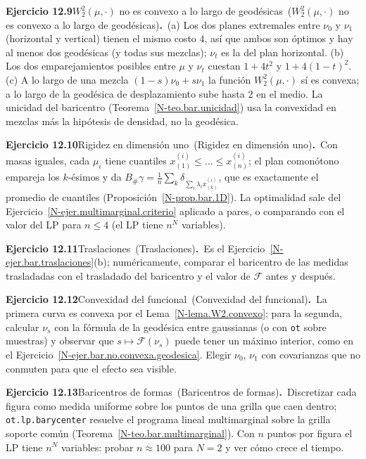 \documentclass[11pt,a4paper]{amsart}
\theoremstyle{remark}
\theoremstyle{definition}
\numberwithin{subsection}{section}
\numberwithin{equation}{section}
\newcommand{\ejlabel}[2]{\par\medskip\noindent\textbf{Ejercicio #1}\ifx\relax#2\relax\else\ (#2)\fi\textbf{.}\ }
\begin{document}
\ejlabel{12.9}{$W_2^2(\mu,\cdot)$ no es convexo a lo largo de geodésicas}(a) Los dos planes extremales entre $\nu_0$ y $\nu_1$ (horizontal y vertical) tienen el mismo costo $4$, así que ambos son óptimos y hay al menos dos geodésicas (y todas sus mezclas); $\nu_t$ es la del plan horizontal. (b) Los dos emparejamientos posibles entre $\mu$ y $\nu_t$ cuestan $1+4t^2$ y $1+4(1-t)^2$. (c) A lo largo de una mezcla $(1-s)\nu_0+s\nu_1$ la función $W_2^2(\mu,\cdot)$ sí es convexa; a lo largo de la geodésica de desplazamiento sube hasta $2$ en el medio. La unicidad del baricentro (Teorema~\ref{N-teo.bar.unicidad}) usa la convexidad en mezclas más la hipótesis de densidad, no la geodésica.

\ejlabel{12.10}{Rigidez en dimensión uno}Con masas iguales, cada $\mu_i$ tiene cuantiles $x^{(i)}_{(1)}\le\dots\le x^{(i)}_{(n)}$; el plan comonótono empareja los $k$-ésimos y da $B_\#\gamma=\frac1n\sum_k\delta_{\sum_i\lambda_ix^{(i)}_{(k)}}$, que es exactamente el promedio de cuantiles (Proposición~\ref{N-prop.bar.1D}). La optimalidad sale del Ejercicio~\ref{N-ejer.multimarginal.criterio} aplicado a pares, o comparando con el valor del LP para $n\le4$ (el LP tiene $n^N$ variables).

\ejlabel{12.11}{Traslaciones}Es el Ejercicio~\ref{N-ejer.bar.traslaciones}(b); numéricamente, comparar el baricentro de las medidas trasladadas con el trasladado del baricentro y el valor de $\mathcal F$ antes y después.

\ejlabel{12.12}{Convexidad del funcional}La primera curva es convexa por el Lema~\ref{N-lema.W2.convexo}; para la segunda, calcular $\nu_s$ con la fórmula de la geodésica entre gaussianas (o con \texttt{ot} sobre muestras) y observar que $s\mapsto\mathcal F(\nu_s)$ puede tener un máximo interior, como en el Ejercicio~\ref{N-ejer.bar.no.convexa.geodesica}. Elegir $\nu_0$, $\nu_1$ con covarianzas que no conmuten para que el efecto sea visible.

\ejlabel{12.13}{Baricentros de formas}Discretizar cada figura como medida uniforme sobre los puntos de una grilla que caen dentro; \texttt{ot.lp.barycenter} resuelve el programa lineal multimarginal sobre la grilla soporte común (Teorema~\ref{N-teo.bar.multimarginal}). Con $n$ puntos por figura el LP tiene $n^N$ variables: probar $n\approx100$ para $N=2$ y ver cómo crece el tiempo.
\end{document}
